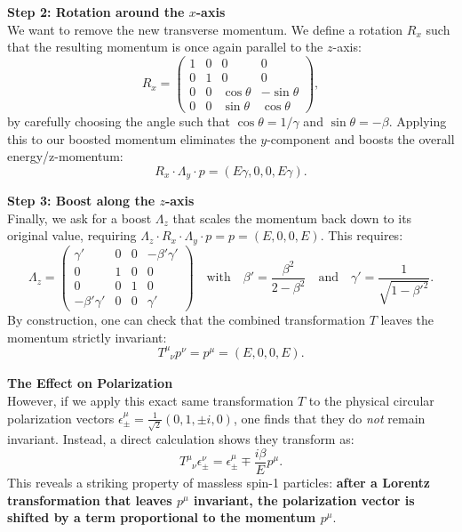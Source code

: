 \textbf{Step 2: Rotation around the $x$-axis} \\
We want to remove the new transverse momentum. We define a rotation $R_x$ such that the resulting momentum is once again parallel to the $z$-axis:
\[
    R_x = \begin{pmatrix}
        1 & 0 & 0          & 0           \\
        0 & 1 & 0          & 0           \\
        0 & 0 & \cos\theta & -\sin\theta \\
        0 & 0 & \sin\theta & \cos\theta
    \end{pmatrix},
\]
by carefully choosing the angle such that $\cos\theta = 1/\gamma$ and $\sin\theta = -\beta$. Applying this to our boosted momentum eliminates the $y$-component and boosts the overall energy/z-momentum:
\[
    R_x \cdot \Lambda_y \cdot p = (E\gamma, 0, 0, E\gamma).
\]

\textbf{Step 3: Boost along the $z$-axis} \\
Finally, we ask for a boost $\Lambda_z$ that scales the momentum back down to its original value, requiring $\Lambda_z \cdot R_x \cdot \Lambda_y \cdot p = p = (E, 0, 0, E)$. This requires:
\[
    \Lambda_z = \begin{pmatrix}
        \gamma'        & 0 & 0 & -\beta'\gamma' \\
        0              & 1 & 0 & 0              \\
        0              & 0 & 1 & 0              \\
        -\beta'\gamma' & 0 & 0 & \gamma'
    \end{pmatrix}
    \quad \text{with} \quad
    \beta' = \frac{\beta^2}{2-\beta^2} \quad \text{and} \quad \gamma' = \frac{1}{\sqrt{1-\beta'^2}}.
\]
By construction, one can check that the combined transformation $T$ leaves the momentum strictly invariant:
\[
    T^\mu_{\phantom{\mu}\nu} p^\nu = p^\mu = (E, 0, 0, E).
\]

\textbf{The Effect on Polarization} \\
However, if we apply this exact same transformation $T$ to the physical circular polarization vectors $\epsilon_\pm^\mu = \frac{1}{\sqrt{2}}(0, 1, \pm i, 0)$, one finds that they do \textit{not} remain invariant. Instead, a direct calculation shows they transform as:
\[
    T^\mu_{\phantom{\mu}\nu} \epsilon_\pm^\nu = \epsilon_\pm^\mu \mp \frac{i\beta}{E} p^\mu.
\]
This reveals a striking property of massless spin-1 particles: \textbf{after a Lorentz transformation that leaves $p^\mu$ invariant, the polarization vector is shifted by a term proportional to the momentum $p^\mu$}.

